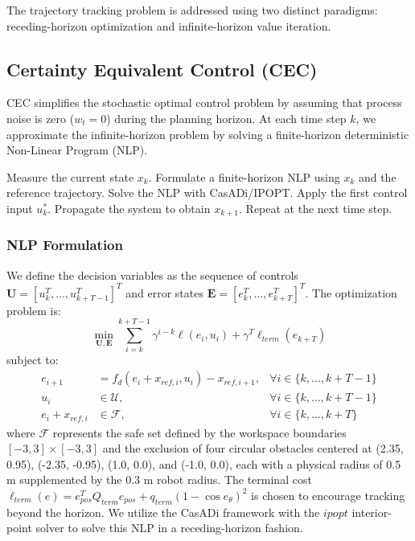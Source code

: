 \documentclass[conference]{IEEEtran}
\begin{document}
The trajectory tracking problem is addressed using two distinct paradigms: receding-horizon optimization and infinite-horizon value iteration.

\subsection{Certainty Equivalent Control (CEC)}
CEC simplifies the stochastic optimal control problem by assuming that process noise is zero ($w_t = 0$) during the planning horizon. At each time step $k$, we approximate the infinite-horizon problem by solving a finite-horizon deterministic Non-Linear Program (NLP).

\begin{algorithm}[H]
\caption{Receding-Horizon CEC}
\begin{algorithmic}[1]
\STATE Measure the current state $x_k$.
\STATE Formulate a finite-horizon NLP using $x_k$ and the reference trajectory.
\STATE Solve the NLP with CasADi/IPOPT.
\STATE Apply the first control input $u_k^*$.
\STATE Propagate the system to obtain $x_{k+1}$.
\STATE Repeat at the next time step.
\end{algorithmic}
\end{algorithm}

\subsubsection{NLP Formulation}
We define the decision variables as the sequence of controls $\mathbf{U} = [u_{k}^T, \dots, u_{k+T-1}^T]^T$ and error states $\mathbf{E} = [e_{k}^T, \dots, e_{k+T}^T]^T$. The optimization problem is:
\begin{equation}
    \min_{\mathbf{U}, \mathbf{E}} \sum_{i=k}^{k+T-1} \gamma^{i-k} \ell(e_i, u_i) + \gamma^T \ell_{term}(e_{k+T})
\end{equation}
subject to:
\begin{equation}
\begin{aligned}
e_{i+1} &= f_d(e_i + x_{ref, i}, u_i) - x_{ref, i+1}, & \forall i \in \{k, \dots, k+T-1\} \\
u_{i} &\in \mathcal{U}, & \forall i \in \{k, \dots, k+T-1\} \\
e_i + x_{ref, i} &\in \mathcal{F}, & \forall i \in \{k, \dots, k+T\}
\end{aligned}
\end{equation}
where $\mathcal{F}$ represents the safe set defined by the workspace boundaries $[-3, 3] \times [-3, 3]$ and the exclusion of four circular obstacles centered at (2.35, 0.95), (-2.35, -0.95), (1.0, 0.0), and (-1.0, 0.0), each with a physical radius of 0.5 m supplemented by the 0.3 m robot radius. The terminal cost $\ell_{term}(e) = e_{pos}^T Q_{term} e_{pos} + q_{term}(1 - \cos e_{\theta})^2$ is chosen to encourage tracking beyond the horizon. We utilize the CasADi framework with the $ipopt$ interior-point solver to solve this NLP in a receding-horizon fashion.
\end{document}
